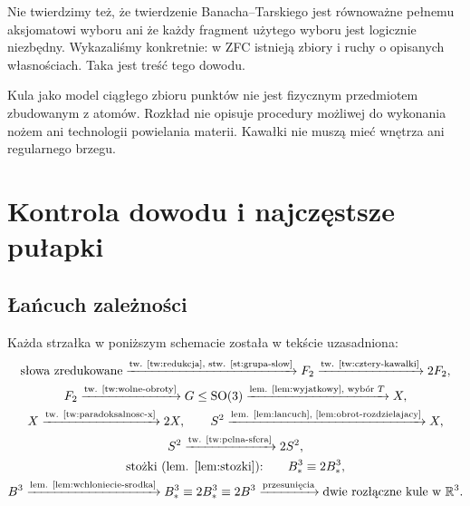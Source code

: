 Nie twierdzimy też, że twierdzenie Banacha--Tarskiego jest równoważne pełnemu aksjomatowi wyboru ani że każdy fragment użytego wyboru jest logicznie niezbędny. Wykazaliśmy konkretnie: w ZFC istnieją zbiory i ruchy o opisanych własnościach. Taka jest treść tego dowodu.

Kula jako model ciągłego zbioru punktów nie jest fizycznym przedmiotem zbudowanym z atomów. Rozkład nie opisuje procedury możliwej do wykonania nożem ani technologii powielania materii. Kawałki nie muszą mieć wnętrza ani regularnego brzegu.

\section{Kontrola dowodu i najczęstsze pułapki}
\subsection{Łańcuch zależności}
Każda strzałka w poniższym schemacie została w tekście uzasadniona:
\[
\begin{gathered}
\text{słowa zredukowane}\xrightarrow{\text{tw. \ref{tw:redukcja}, stw. \ref{st:grupa-slow}}}F_2
\xrightarrow{\text{tw. \ref{tw:cztery-kawalki}}}2F_2,\\
F_2\xrightarrow{\text{tw. \ref{tw:wolne-obroty}}}G\le\mathrm{SO}(3)
\xrightarrow{\text{lem. \ref{lem:wyjatkowy}, wybór }T}X,\\
X\xrightarrow{\text{tw. \ref{tw:paradoksalnosc-x}}}2X,
\qquad S^2\xrightarrow{\text{lem. \ref{lem:lancuch}, \ref{lem:obrot-rozdzielajacy}}}X,\\
S^2\xrightarrow{\text{tw. \ref{tw:pelna-sfera}}}2S^2,\\
\text{stożki (lem. \ref{lem:stozki}):}\qquad B^3_*\equiv2B^3_*,\\
B^3\xrightarrow{\text{lem. \ref{lem:wchloniecie-srodka}}}B^3_*
\equiv2B^3_*\equiv2B^3
\xrightarrow{\text{przesunięcia}}\text{dwie rozłączne kule w }\mathbb R^3.
\end{gathered}
\]
